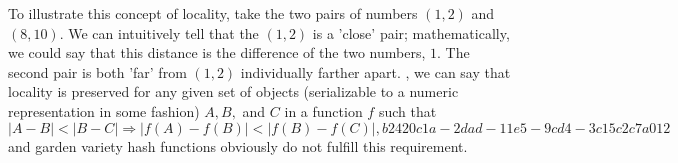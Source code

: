 \documentclass[12pt]{article}
\begin{document}
\par To illustrate this concept of locality, take the two pairs of numbers $(1,2)$ and $(8,10)$. We can intuitively tell that the $(1,2)$ is a 'close' pair; mathematically, we could say that this distance is the difference of the two numbers, $1$. The second pair is both 'far' from $(1,2)$ individually farther apart. , we can say that locality is preserved for any given set of objects (serializable to a numeric representation in some fashion) $A,B,$ and $C$ in a function $f$ such that
\begin{equation}
|A-B| < |B-C| \Rightarrow |f(A)-f(B)| < |f(B) - f(C)|,
b2420c1a-2dad-11e5-9cd4-3c15c2c7a012\end{equation}
and garden variety hash functions obviously do not fulfill this requirement.

\printbibliography
\end{document}
